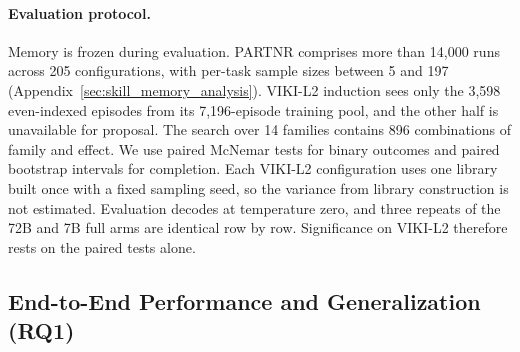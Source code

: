 \documentclass{article}
\theoremstyle{plain}
\theoremstyle{definition}
\theoremstyle{remark}
\begin{document}
\paragraph{Evaluation protocol.}
Memory is frozen during evaluation. PARTNR comprises more than 14{,}000 runs across 205 configurations, with per-task sample sizes between 5 and 197 (Appendix~\ref{sec:skill_memory_analysis}). VIKI-L2 induction sees only the 3{,}598 even-indexed episodes from its 7{,}196-episode training pool, and the other half is unavailable for proposal. The search over 14 families contains 896 combinations of family and effect. We use paired McNemar tests for binary outcomes and paired bootstrap intervals for completion. Each VIKI-L2 configuration uses one library built once with a fixed sampling seed, so the variance from library construction is not estimated. Evaluation decodes at temperature zero, and three repeats of the 72B and 7B full arms are identical row by row. Significance on VIKI-L2 therefore rests on the paired tests alone.

\subsection{End-to-End Performance and Generalization (RQ1)}
\label{subsec:main_results}
\label{subsec:generalization}
\end{document}
